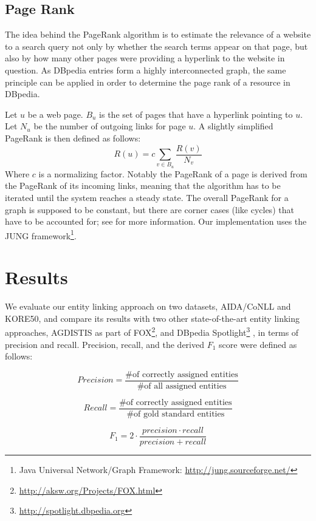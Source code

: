 \documentclass[runningheads,a4paper]{llncs}
\begin{document}
{%
\subsection{Page Rank}

The idea behind the PageRank \cite{pageRank} algorithm is to estimate the relevance of a website to a search query not only by whether the search terms appear on that page, but also by how many other pages were providing a hyperlink to the website in question. As DBpedia entries form a highly interconnected graph, the same principle can be applied in order to determine the page rank of a resource in DBpedia.

Let $u$ be a web page. $B_u$ is the set of pages that have a hyperlink pointing to $u$. Let $N_u$ be the number of outgoing links for page $u$. A slightly simplified PageRank is then defined as follows: 
$$R(u) = c \sum_{v \in B_u} \frac{R(v)}{N_v}$$
Where $c$ is a normalizing factor. Notably the PageRank of a page is derived from the PageRank of its incoming links, meaning that the algorithm has to be iterated until the system reaches a steady state. The overall PageRank for a graph is supposed to be constant, but there are corner cases (like cycles) that have to be accounted for; see \cite{pageRank} for more information. Our implementation uses the JUNG framework\footnote{Java Universal Network/Graph Framework: \url{http://jung.sourceforge.net/}}.

\section{Results}\label{sec:results}

We evaluate our entity linking approach on two datasets, AIDA/CoNLL and KORE50, and compare its results with two other state-of-the-art entity linking approaches, AGDISTIS \cite{agdistis} as part of FOX\footnote{\url{http://aksw.org/Projects/FOX.html}}, and DBpedia Spotlight\footnote{\url{http://spotlight.dbpedia.org}} \cite{spotlight},  
in terms of precision and recall. Precision, recall, and the derived $F_1$ score were defined as follows:

$$Precision = \frac{\text{\# of correctly assigned entities}}{\text{\# of all assigned entities}}$$

$$Recall = \frac{\text{\# of correctly assigned entities}}{\text{\# of gold standard entities}}$$

$$F_1 = 2 \cdot \frac{precision \cdot recall}{precision + recall}$$

}
\end{document}
